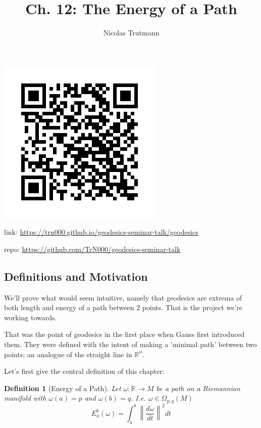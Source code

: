\documentclass{article}
\title{Ch. 12: The Energy of a Path}
\author{Nicolas Trutmann}
\date{}
\newtheorem{def}{Definition}
\renewcommand{\Rn}[1][n]{\mathbb{R}^{#1}}
\newcommand{\Absbars}[1]{\left\lVert#1\right\rVert}
\newcommand{\rmfd}[1]{Riemannian manifold}
\begin{document}
\includegraphics{img/qr.png}

link: \href{https://trn000.github.io/geodesics-seminar-talk/geodesics}{https://trn000.github.io/geodesics-seminar-talk/geodesics}

repo: \href{https://github.com/TrN000/geodesics-seminar-talk}{https://github.com/TrN000/geodesics-seminar-talk}


\maketitle





\subsection{Definitions and Motivation}

We'll prove what would seem intuitive, namely that geodesics are extrema of both length and energy of
a path between 2 points. That is the project we're working towards.

That was the point of geodesics in the first place when Gauss first introduced
them. They were defined with the intent of making a 'minimal path' between two
points; an analogue of the straight line in $\Rn$.


Let's first give the central definition of this chapter:

\begin{def}[Energy of a Path]
Let $\omega : \Rn[] \rightarrow M $ be a path on a \rmfd, with $\omega(a) = p$ and $\omega(b) = q$.
I.e. $\omega \in \Omega_{p,q}(M)$
\[ E_a^b(\omega) = \int_a^b \Absbars{\frac{d\omega}{dt}}^2 dt \]
\end{def}
\end{document}
